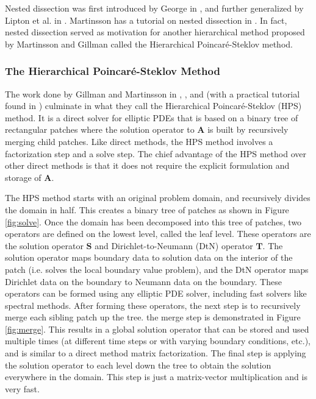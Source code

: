 Nested dissection was first introduced by George in \cite{george1973nested}, and further generalized by Lipton et al. in \cite{lipton1979generalized}. Martinsson has a tutorial on nested dissection in \cite{martinsson2019fast}. In fact, nested dissection served as motivation for another hierarchical method proposed by Martinsson and Gillman called the Hierarchical Poincaré-Steklov method.

\subsubsection{The Hierarchical Poincaré-Steklov Method}
\label{subsub:hps-method}

The work done by Gillman and Martinsson in \cite{martinsson2004fast}, \cite{MARTINSSON2013460}, and \cite{gillman2014direct} (with a practical tutorial found in \cite{martinsson2015hierarchical}) culminate in what they call the Hierarchical Poincaré-Steklov (HPS) method. It is a direct solver for elliptic PDEs that is based on a binary tree of rectangular patches where the solution operator to $\textbf{A}$ is built by recursively merging child patches. Like direct methods, the HPS method involves a factorization step and a solve step. The chief advantage of the HPS method over other direct methods is that it does not require the explicit formulation and storage of $\textbf{A}$.

The HPS method starts with an original problem domain, and recursively divides the domain in half. This creates a binary tree of patches as shown in Figure \ref{fig:solve}. Once the domain has been decomposed into this tree of patches, two operators are defined on the lowest level, called the leaf level. These operators are the solution operator $\textbf{S}$ and Dirichlet-to-Neumann (DtN) operator $\textbf{T}$. The solution operator maps boundary data to solution data on the interior of the patch (i.e. solves the local boundary value problem), and the DtN operator maps Dirichlet data on the boundary to Neumann data on the boundary. These operators can be formed using any elliptic PDE solver, including fast solvers like spectral methods. After forming these operators, the next step is to recursively merge each sibling patch up the tree. the merge step is demonstrated in Figure \ref{fig:merge}. This results in a global solution operator that can be stored and used multiple times (at different time steps or with varying boundary conditions, etc.), and is similar to a direct method matrix factorization. The final step is applying the solution operator to each level down the tree to obtain the solution everywhere in the domain. This step is just a matrix-vector multiplication and is very fast.

